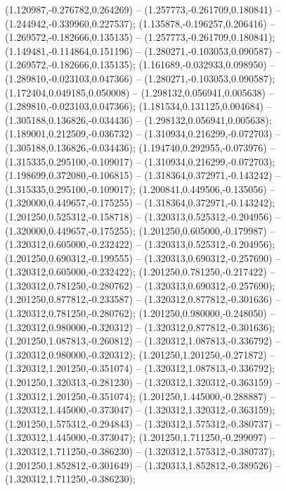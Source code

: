  (1.120987,-0.276782,0.264269) -- (1.257773,-0.261709,0.180841) -- (1.244942,-0.339960,0.227537);
 (1.135878,-0.196257,0.206416) -- (1.269572,-0.182666,0.135135) -- (1.257773,-0.261709,0.180841);
 (1.149481,-0.114864,0.151196) -- (1.280271,-0.103053,0.090587) -- (1.269572,-0.182666,0.135135);
 (1.161689,-0.032933,0.098950) -- (1.289810,-0.023103,0.047366) -- (1.280271,-0.103053,0.090587);
 (1.172404,0.049185,0.050008) -- (1.298132,0.056941,0.005638) -- (1.289810,-0.023103,0.047366);
 (1.181534,0.131125,0.004684) -- (1.305188,0.136826,-0.034436) -- (1.298132,0.056941,0.005638);
 (1.189001,0.212509,-0.036732) -- (1.310934,0.216299,-0.072703) -- (1.305188,0.136826,-0.034436);
 (1.194740,0.292955,-0.073976) -- (1.315335,0.295100,-0.109017) -- (1.310934,0.216299,-0.072703);
 (1.198699,0.372080,-0.106815) -- (1.318364,0.372971,-0.143242) -- (1.315335,0.295100,-0.109017);
 (1.200841,0.449506,-0.135056) -- (1.320000,0.449657,-0.175255) -- (1.318364,0.372971,-0.143242);
 (1.201250,0.525312,-0.158718) -- (1.320313,0.525312,-0.204956) -- (1.320000,0.449657,-0.175255);
 (1.201250,0.605000,-0.179987) -- (1.320312,0.605000,-0.232422) -- (1.320313,0.525312,-0.204956);
 (1.201250,0.690312,-0.199555) -- (1.320313,0.690312,-0.257690) -- (1.320312,0.605000,-0.232422);
 (1.201250,0.781250,-0.217422) -- (1.320312,0.781250,-0.280762) -- (1.320313,0.690312,-0.257690);
 (1.201250,0.877812,-0.233587) -- (1.320312,0.877812,-0.301636) -- (1.320312,0.781250,-0.280762);
 (1.201250,0.980000,-0.248050) -- (1.320312,0.980000,-0.320312) -- (1.320312,0.877812,-0.301636);
 (1.201250,1.087813,-0.260812) -- (1.320312,1.087813,-0.336792) -- (1.320312,0.980000,-0.320312);
 (1.201250,1.201250,-0.271872) -- (1.320312,1.201250,-0.351074) -- (1.320312,1.087813,-0.336792);
 (1.201250,1.320313,-0.281230) -- (1.320312,1.320312,-0.363159) -- (1.320312,1.201250,-0.351074);
 (1.201250,1.445000,-0.288887) -- (1.320312,1.445000,-0.373047) -- (1.320312,1.320312,-0.363159);
 (1.201250,1.575312,-0.294843) -- (1.320312,1.575312,-0.380737) -- (1.320312,1.445000,-0.373047);
 (1.201250,1.711250,-0.299097) -- (1.320312,1.711250,-0.386230) -- (1.320312,1.575312,-0.380737);
 (1.201250,1.852812,-0.301649) -- (1.320313,1.852812,-0.389526) -- (1.320312,1.711250,-0.386230);
